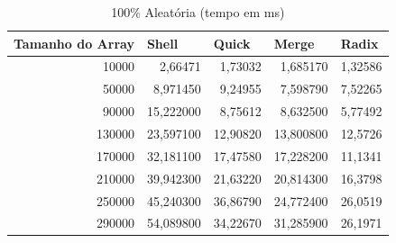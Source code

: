 \documentclass[a4paper, 12pt]{article}
\begin{document}
\begin{longtable}[c]{@{}rrrrr@{}}
	\caption{100\% Aleatória (tempo em ms)}
	\label{tab:aleatoria2-table}\\
	\toprule
	\multicolumn{1}{l}{\textbf{Tamanho do Array}} & \multicolumn{1}{l}{\textbf{Shell}} & \multicolumn{1}{l}{\textbf{Quick}} & \multicolumn{1}{l}{\textbf{Merge}} & \multicolumn{1}{l}{\textbf{Radix}} \\* \midrule
	\endfirsthead
	\endhead
	\multicolumn{1}{|r|}{10000}                   & \multicolumn{1}{r|}{2,66471}       & \multicolumn{1}{r|}{1,73032}       & \multicolumn{1}{r|}{1,685170}      & \multicolumn{1}{r|}{1,32586}       \\* \midrule
	\multicolumn{1}{|r|}{50000}                   & \multicolumn{1}{r|}{8,971450}      & \multicolumn{1}{r|}{9,24955}       & \multicolumn{1}{r|}{7,598790}      & \multicolumn{1}{r|}{7,52265}       \\* \midrule
	\multicolumn{1}{|r|}{90000}                   & \multicolumn{1}{r|}{15,222000}     & \multicolumn{1}{r|}{8,75612}       & \multicolumn{1}{r|}{8,632500}      & \multicolumn{1}{r|}{5,77492}       \\* \midrule
	\multicolumn{1}{|r|}{130000}                  & \multicolumn{1}{r|}{23,597100}     & \multicolumn{1}{r|}{12,90820}      & \multicolumn{1}{r|}{13,800800}     & \multicolumn{1}{r|}{12,5726}       \\* \midrule
	\multicolumn{1}{|r|}{170000}                  & \multicolumn{1}{r|}{32,181100}     & \multicolumn{1}{r|}{17,47580}      & \multicolumn{1}{r|}{17,228200}     & \multicolumn{1}{r|}{11,1341}       \\* \midrule
	\multicolumn{1}{|r|}{210000}                  & \multicolumn{1}{r|}{39,942300}     & \multicolumn{1}{r|}{21,63220}      & \multicolumn{1}{r|}{20,814300}     & \multicolumn{1}{r|}{16,3798}       \\* \midrule
	\multicolumn{1}{|r|}{250000}                  & \multicolumn{1}{r|}{45,240300}     & \multicolumn{1}{r|}{36,86790}      & \multicolumn{1}{r|}{24,772400}     & \multicolumn{1}{r|}{26,0519}       \\* \midrule
	\multicolumn{1}{|r|}{290000}                  & \multicolumn{1}{r|}{54,089800}     & \multicolumn{1}{r|}{34,22670}      & \multicolumn{1}{r|}{31,285900}     & \multicolumn{1}{r|}{26,1971}       \\* \midrule

\end{longtable}
\end{document}
